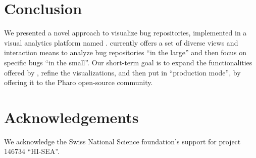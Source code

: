 
\section{Conclusion}

We presented a novel approach to visualize bug repositories, implemented in a visual analytics platform named \ib. \ib currently offers a set of diverse views and interaction means to analyze bug repositories ``in the large'' and then focus on specific bugs ``in the small''. Our short-term goal is to expand the functionalities offered by \ib, refine the visualizations, and then put \ib in ``production mode'', by offering it to the Pharo open-source community.


\section*{Acknowledgements}

We acknowledge the Swiss National Science foundation's support for project 146734 ``HI-SEA''.









